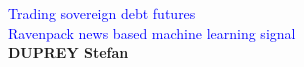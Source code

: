 \documentclass[a4, 14pts]{seminar}
\newcommand\eadsccr{\textsf{}\xspace}
\begin{document}
\begin{slide}
\thispagestyle{plain}
\begin{center}
\textcolor{blue}{\huge  Trading sovereign debt futures}\\
\textcolor{blue}{\huge  Ravenpack news based machine learning signal}\\
\vspace{0.25 cm}
\textbf{DUPREY Stefan}\\
\small{\textbf{}\\ 

	    }
\end{center}
\end{slide}
\end{document}
